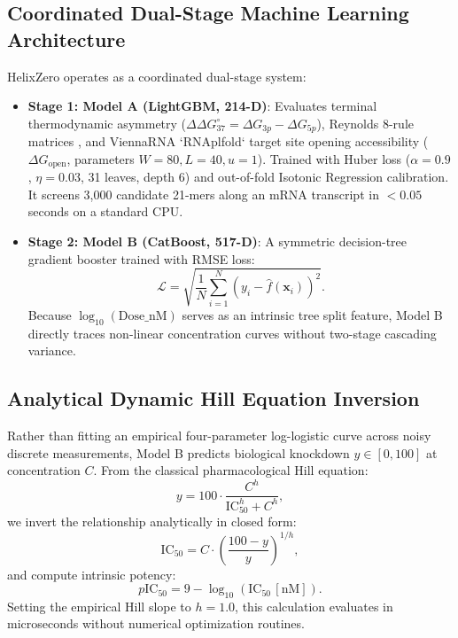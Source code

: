 \documentclass[twocolumn]{article}
\begin{document}
\subsection{Coordinated Dual-Stage Machine Learning Architecture}
HelixZero operates as a coordinated dual-stage system:
\begin{itemize}
    \item \textbf{Stage 1: Model A (LightGBM, 214-D)}: Evaluates terminal thermodynamic asymmetry ($\Delta\Delta G^\circ_{37} = \Delta G_{3p} - \Delta G_{5p}$), Reynolds 8-rule matrices \cite{reynolds2004rational}, and ViennaRNA `RNAplfold` target site opening accessibility ($\Delta G_{\text{open}}$, parameters $W=80, L=40, u=1$). Trained with Huber loss ($\alpha = 0.9$, $\eta = 0.03$, 31 leaves, depth 6) and out-of-fold Isotonic Regression calibration. It screens 3,000 candidate 21-mers along an mRNA transcript in $< 0.05$ seconds on a standard CPU.
    \item \textbf{Stage 2: Model B (CatBoost, 517-D)}: A symmetric decision-tree gradient booster trained with RMSE loss:
    \begin{equation}
    \mathcal{L} = \sqrt{\frac{1}{N} \sum_{i=1}^N \left( y_i - \hat{f}(\mathbf{x}_i) \right)^2}.
    \end{equation}
    Because $\log_{10}(\text{Dose\_nM})$ serves as an intrinsic tree split feature, Model B directly traces non-linear concentration curves without two-stage cascading variance.
\end{itemize}

\subsection{Analytical Dynamic Hill Equation Inversion}
Rather than fitting an empirical four-parameter log-logistic curve across noisy discrete measurements, Model B predicts biological knockdown $y \in [0, 100]$ at concentration $C$. From the classical pharmacological Hill equation:
\begin{equation}
y = 100 \cdot \frac{C^h}{\text{IC}_{50}^h + C^h},
\end{equation}
we invert the relationship analytically in closed form:
\begin{equation}
\text{IC}_{50} = C \cdot \left( \frac{100 - y}{y} \right)^{1/h},
\end{equation}
and compute intrinsic potency:
\begin{equation}
p\text{IC}_{50} = 9 - \log_{10}(\text{IC}_{50} \, [\text{nM}]).
\end{equation}
Setting the empirical Hill slope to $h = 1.0$, this calculation evaluates in microseconds without numerical optimization routines.
\end{document}
